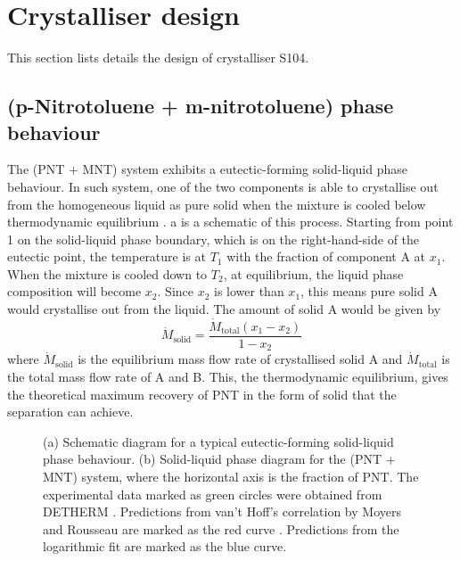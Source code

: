 \section{Crystalliser design}

This section lists details the design of crystalliser S104. 

\subsection{(p-Nitrotoluene + m-nitrotoluene) phase behaviour}

The (PNT + MNT) system exhibits a eutectic-forming solid-liquid phase behaviour. In such system, one of the two components is able to crystallise out from the homogeneous liquid as pure solid when the mixture is cooled below thermodynamic equilibrium \cite{seader_separation_2011}. a is a schematic of this process. Starting from point 1 on the solid-liquid phase boundary, which is on the right-hand-side of the eutectic point, the temperature is at $T_1$ with the fraction of component A at $x_1$. When the mixture is cooled down to $T_2$, at equilibrium, the liquid phase composition will become $x_2$. Since $x_2$ is lower than $x_1$, this means pure solid A would crystallise out from the liquid. The amount of solid A would be given by
\begin{equation}\label{eq:amount solid A equilibrium}
    \dot{M}_{\mathrm{solid}} = \frac{\dot{M}_{\mathrm{total}} (x_1 - x_2)}{1 - x_2}
\end{equation}
where $\dot{M}_{\mathrm{solid}}$ is the equilibrium mass flow rate of crystallised solid A and $\dot{M}_{\mathrm{total}}$ is the total mass flow rate of A and B. This, the thermodynamic equilibrium, gives the theoretical maximum recovery of PNT in the form of solid that the separation can achieve.

\begin{figure}[h]
    \centering
    
    \caption{(a) Schematic diagram for a typical eutectic-forming solid-liquid phase behaviour. (b) Solid-liquid phase diagram for the (PNT + MNT) system, where the horizontal axis is the fraction of PNT. The experimental data marked as green circles were obtained from DETHERM \cite{noauthor_detherm_2021}. Predictions from van't Hoff's correlation by Moyers and Rousseau are marked as the red curve \cite{moyers_crystallization_1987}. Predictions from the logarithmic fit are marked as the blue curve.}
    \label{fig:eutectic schematic}
\end{figure}

